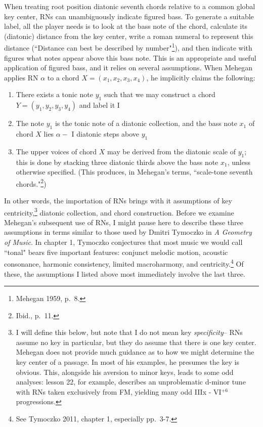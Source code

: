 When treating root position diatonic seventh chords relative to a common global key center, RNs can unambiguously indicate figured bass.  To generate a suitable label, all the player needs is to look at the bass note of the chord, calculate its (diatonic) distance from the key center, write a roman numeral to represent this distance (``Distance can best be described by number"\footnote{Mehegan 1959, p.\ 8.}), and then indicate with figures what notes appear above this bass note.  This is an appropriate and useful application of figured bass, and it relies on several assumptions.  When Mehegan applies RN $\alpha$ to a chord $X = (x_1,x_2,x_3,x_4)$, he implicitly claims the following:\
\begin{enumerate}
	\item There exists a tonic note $y_1$ such that we may construct a chord $Y = (y_1,y_2,y_3,y_4)$ and label it I
	\item The note $y_1$ is the tonic note of a diatonic collection, and the bass note $x_1$ of chord $X$ lies $\alpha -$ I diatonic steps above $y_1$
	\item The upper voices of chord $X$ may be derived from the diatonic scale of $y_1$; this is done by stacking three diatonic thirds above the bass note $x_1$, unless otherwise specified.  (This produces, in Mehegan's terms, ``scale-tone seventh chords."\footnote{Ibid., p.\ 11.})
\end{enumerate}
In other words, the importation of RNs brings with it assumptions of key centricity,\footnote{I will define this below, but note that I do not mean key \emph{specificity}-- RNs assume no key in particular, but they do assume that there is one key center. Mehegan does not provide much guidance as to how we might determine the key center of a passage.  In most of his examples, he presumes the key is obvious.  This, alongside his aversion to minor keys, leads to some odd analyses: lesson 22, for example, describes an unproblematic d-minor tune with RNs taken exclusively from FM, yielding many odd IIIx - VI$^{+6}$ progressions.} diatonic collection, and chord construction.  Before we examine Mehegan's subsequent use of RNs, I might pause here to describe these three assumptions in terms similar to those used by Dmitri Tymoczko in \emph{A Geometry of Music}.  In chapter 1, Tymoczko conjectures that most music we would call ``tonal" bears five important features: conjunct melodic motion, acoustic consonance, harmonic consistency, limited macroharmony, and centricity.\footnote{See Tymoczko 2011, chapter 1, especially pp.\ 3-7.}  Of these, the assumptions I listed above most immediately involve the last three.

